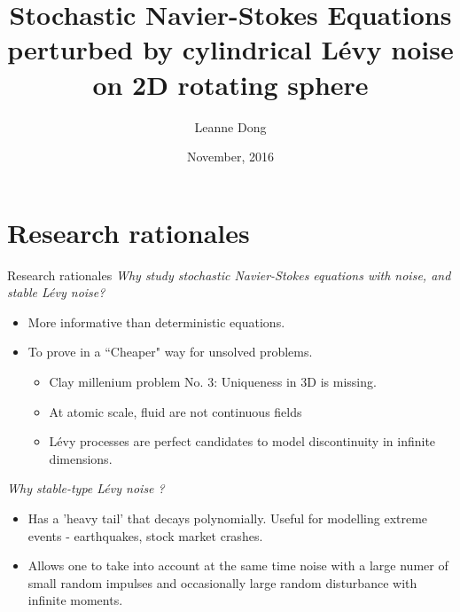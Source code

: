 \documentclass[xcolor=dvipsnames,leqno]{beamer}
\title{Stochastic Navier-Stokes Equations perturbed by cylindrical L\'evy noise on 2D rotating sphere}
\author[Leanne Dong]{Leanne Dong\\
\vspace{1cm}{\small Supervised by: Prof. Ben Goldys}}
\institute[Usyd]{School of Mathematics and Statistics\\
University of Sydney}
\date{November, 2016}
\begin{document}
	\begin{frame}
	  \titlepage
	\end{frame}

\section[]{Research rationales}  
\begin{frame}{Research rationales}
	\emph{Why study stochastic Navier-Stokes equations {\color{red}with noise, and {\color{red}stable} L\'evy noise}?}
	\begin{itemize}         
		\item More informative than deterministic equations.
		\item To prove in a ``Cheaper" way for unsolved problems.\\
		\begin{itemize}
			\item Clay millenium problem No. 3: Uniqueness in 3D is missing.
			\item At atomic scale, fluid are not continuous fields
			\item L\'evy processes are perfect candidates to model discontinuity in infinite dimensions.
		\end{itemize}
	\end{itemize}
	\emph{Why stable-type L\'evy noise ?}
	\begin{itemize}
		\item Has a 'heavy tail' that decays polynomially. Useful for modelling extreme events - earthquakes, stock market crashes.
		\item Allows one to take into account at the same time noise with a large numer of small random impulses and occasionally large random disturbance with infinite moments.
	\end{itemize} 
\end{frame}
\end{document}
